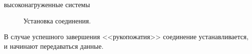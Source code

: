 высоконагруженные системы



\begin{figure}[h!]
	\begin{center}
		\caption{Установка соединения.}
		\label{image:handshake}
	\end{center}
\end{figure}

\pagebreak

В случае успешного завершения <<рукопожатия>> соединение устанавливается, и начинают передаваться данные. \\
















